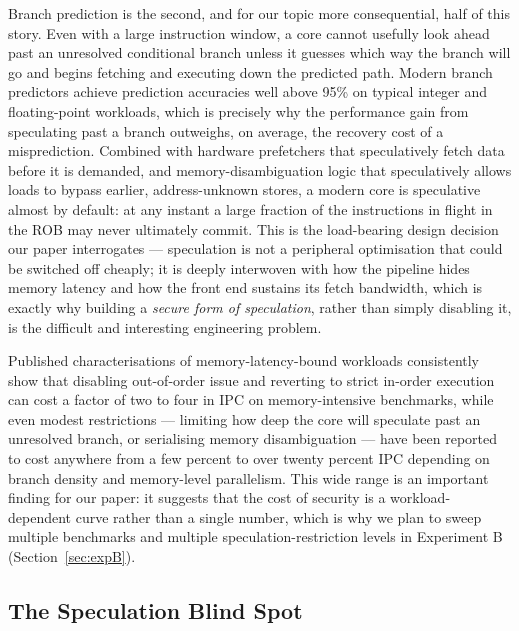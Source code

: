 \documentclass[11pt,a4paper]{article}
\begin{document}
Branch prediction is the second, and for our topic more consequential, half of
this story. Even with a large instruction window, a core cannot usefully look
ahead past an unresolved conditional branch unless it guesses which way the
branch will go and begins fetching and executing down the predicted path. Modern
branch predictors achieve prediction accuracies well above 95\% on typical
integer and floating-point workloads, which is precisely why the performance
gain from speculating past a branch outweighs, on average, the recovery cost of
a misprediction. Combined with hardware prefetchers that speculatively fetch
data before it is demanded, and memory-disambiguation logic that speculatively
allows loads to bypass earlier, address-unknown stores, a modern core is
speculative almost by default: at any instant a large fraction of the
instructions in flight in the ROB may never ultimately commit. This is the
load-bearing design decision our paper interrogates --- speculation is not a
peripheral optimisation that could be switched off cheaply; it is deeply
interwoven with how the pipeline hides memory latency and how the front end
sustains its fetch bandwidth, which is exactly why building a \emph{secure form
of speculation}, rather than simply disabling it, is the difficult and
interesting engineering problem.

Published characterisations of memory-latency-bound workloads consistently show
that disabling out-of-order issue and reverting to strict in-order execution can
cost a factor of two to four in IPC on memory-intensive benchmarks, while even
modest restrictions --- limiting how deep the core will speculate past an
unresolved branch, or serialising memory disambiguation --- have been reported
to cost anywhere from a few percent to over twenty percent IPC depending on
branch density and memory-level parallelism. This wide range is an important
finding for our paper: it suggests that the cost of security is a
workload-dependent curve rather than a single number, which is why we plan to
sweep multiple benchmarks and multiple speculation-restriction levels in
Experiment B (Section~\ref{sec:expB}).

\subsection{The Speculation Blind Spot}
\label{sec:blindspot}
\end{document}

